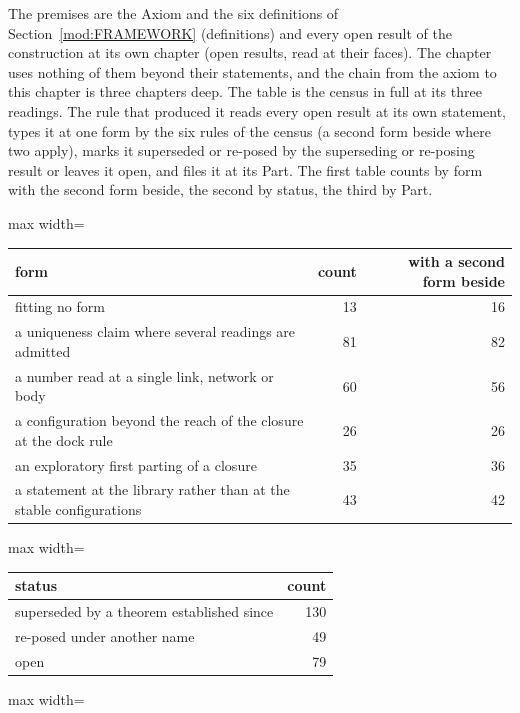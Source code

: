 \begin{chproof}[instrument]
The premises are the Axiom and the six definitions of Section~\ref{mod:FRAMEWORK} (definitions) and every open result of the construction at its own chapter (open results, read at their faces). The chapter uses nothing of them beyond their statements, and the chain from the axiom to this chapter is three chapters deep.
The table is the census in full at its three readings. The rule that produced it reads every open result at its own statement, types it at one form by the six rules of the census (a second form beside where two apply), marks it superseded or re-posed by the superseding or re-posing result or leaves it open, and files it at its Part. The first table counts by form with the second form beside, the second by status, the third by Part.
\begin{center}
\begin{adjustbox}{max width=\linewidth}\begin{tabular}{lrr}
\hline
form & count & with a second form beside \\
\hline
fitting no form & 13 & 16 \\
a uniqueness claim where several readings are admitted & 81 & 82 \\
a number read at a single link, network or body & 60 & 56 \\
a configuration beyond the reach of the closure at the dock rule & 26 & 26 \\
an exploratory first parting of a closure & 35 & 36 \\
a statement at the library rather than at the stable configurations & 43 & 42 \\
\hline
\end{tabular}\end{adjustbox}
\qquad
\begin{adjustbox}{max width=\linewidth}\begin{tabular}{lr}
\hline
status & count \\
\hline
superseded by a theorem established since & 130 \\
re-posed under another name & 49 \\
open & 79 \\
\hline
\end{tabular}\end{adjustbox}
\end{center}
\begin{center}
\begin{adjustbox}{max width=\linewidth}\begin{tabular}{lrlr}

\end{tabular}
\end{adjustbox}
\end{center}
\end{chproof}
